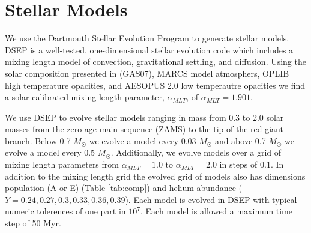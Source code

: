 \section{Stellar Models}\label{sec:modeling}
We use the Dartmouth Stellar Evolution Program \citep[DSEP, ][]{Dotter2008} to
generate stellar models. DSEP is a well-tested, one-dimensional stellar
evolution code which includes a mixing length model of convection,
gravitational settling, and diffusion. Using the solar composition presented in
\citep{Grevesse2007} (GAS07), MARCS model atmosphers, OPLIB high temperature
opacities, and AESOPUS 2.0 low temperautre opacities we find a solar calibrated
mixing length parameter, $\alpha_{MLT}$, of $\alpha_{MLT} = 1.901$.

We use DSEP to evolve stellar models ranging in mass from 0.3 to 2.0 solar
masses from the zero-age main sequence (ZAMS) to the tip of the red giant
branch. Below 0.7 $M_{\odot}$ we evolve a model every 0.03 $M_{\odot}$ and
above 0.7 $M_{\odot}$ we evolve a model every 0.5 $M_{\odot}$. Additionally, we
evolve models over a grid of mixing length parameters from $\alpha_{MLT} = 1.0$
to $\alpha_{MLT} = 2.0$ in steps of 0.1. In addition to the mixing length grid
the evolved grid of models also has dimensions population (A or E) (Table
\ref{tab:comp}) and helium abundance ($Y=0.24, 0.27, 0.3, 0.33, 0.36, 0.39$).
Each model is evolved in DSEP with typical numeric tolerences of one part in
$10^{7}$. Each model is allowed a maximum time step of 50 Myr. 

